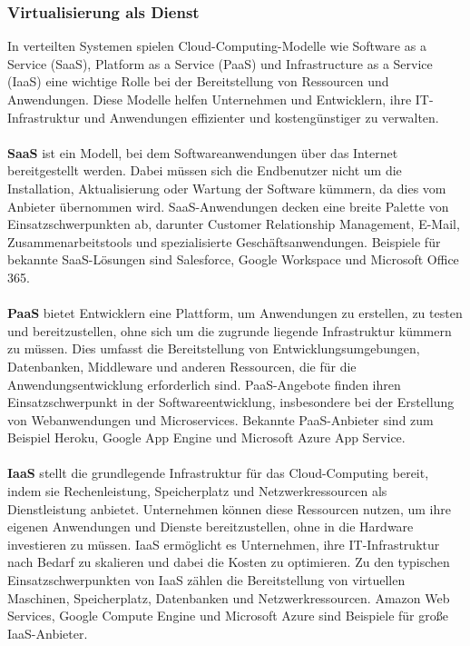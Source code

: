 \documentclass[../vs-script-first-v01.tex]{subfiles}
\begin{document}
\subsubsection{Virtualisierung als Dienst}

In verteilten Systemen spielen Cloud-Computing-Modelle wie Software as a Service (SaaS), Platform as a Service (PaaS) und Infrastructure as a Service (IaaS) eine wichtige Rolle bei der Bereitstellung von Ressourcen und Anwendungen. Diese Modelle helfen Unternehmen und Entwicklern, ihre IT-Infrastruktur und Anwendungen effizienter und kostengünstiger zu verwalten.
\\\\
\textbf{SaaS} ist ein Modell, bei dem Softwareanwendungen über das Internet bereitgestellt werden. Dabei müssen sich die Endbenutzer nicht um die Installation, Aktualisierung oder Wartung der Software kümmern, da dies vom Anbieter übernommen wird. SaaS-Anwendungen decken eine breite Palette von Einsatzschwerpunkten ab, darunter Customer Relationship Management, E-Mail, Zusammenarbeitstools und spezialisierte Geschäftsanwendungen. Beispiele für bekannte SaaS-Lösungen sind Salesforce, Google Workspace und Microsoft Office 365.
\\\\
\textbf{PaaS} bietet Entwicklern eine Plattform, um Anwendungen zu erstellen, zu testen und bereitzustellen, ohne sich um die zugrunde liegende Infrastruktur kümmern zu müssen. Dies umfasst die Bereitstellung von Entwicklungsumgebungen, Datenbanken, Middleware und anderen Ressourcen, die für die Anwendungsentwicklung erforderlich sind. PaaS-Angebote finden ihren Einsatzschwerpunkt in der Softwareentwicklung, insbesondere bei der Erstellung von Webanwendungen und Microservices. Bekannte PaaS-Anbieter sind zum Beispiel Heroku, Google App Engine und Microsoft Azure App Service.
\\\\
\textbf{IaaS} stellt die grundlegende Infrastruktur für das Cloud-Computing bereit, indem sie Rechenleistung, Speicherplatz und Netzwerkressourcen als Dienstleistung anbietet. Unternehmen können diese Ressourcen nutzen, um ihre eigenen Anwendungen und Dienste bereitzustellen, ohne in die Hardware investieren zu müssen. IaaS ermöglicht es Unternehmen, ihre IT-Infrastruktur nach Bedarf zu skalieren und dabei die Kosten zu optimieren. Zu den typischen Einsatzschwerpunkten von IaaS zählen die Bereitstellung von virtuellen Maschinen, Speicherplatz, Datenbanken und Netzwerkressourcen. Amazon Web Services, Google Compute Engine und Microsoft Azure sind Beispiele für große IaaS-Anbieter.
\end{document}
